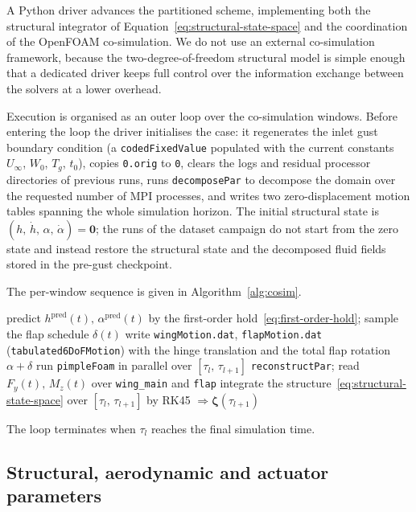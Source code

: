 A Python driver advances the partitioned scheme, implementing both the structural integrator of Equation~\eqref{eq:structural-state-space} and the coordination of the OpenFOAM co-simulation. We do not use an external co-simulation framework, because the two-degree-of-freedom structural model is simple enough that a dedicated driver keeps full control over the information exchange between the solvers at a lower overhead.

Execution is organised as an outer loop over the co-simulation windows. Before entering the loop the driver initialises the case: it regenerates the inlet gust boundary condition (a \texttt{codedFixedValue} populated with the current constants $U_\infty$, $W_0$, $T_g$, $t_0$), copies \texttt{0.orig} to \texttt{0}, clears the logs and residual processor directories of previous runs, runs \texttt{decomposePar} to decompose the domain over the requested number of MPI processes, and writes two zero-displacement motion tables spanning the whole simulation horizon. The initial structural state is $(h,\,\dot h,\,\alpha,\,\dot\alpha) = \mathbf 0$; the runs of the dataset campaign do not start from the zero state and instead restore the structural state and the decomposed fluid fields stored in the pre-gust checkpoint.

The per-window sequence is given in Algorithm~\ref{alg:cosim}.

\begin{algorithm}[H]
\caption{Per-window sequence of the partitioned co-simulation driver}
\label{alg:cosim}
\begin{algorithmic}[1]
    \STATE predict $h^{\mathrm{pred}}(t),\,\alpha^{\mathrm{pred}}(t)$ by the first-order hold~\eqref{eq:first-order-hold}; sample the flap schedule $\delta(t)$
    \STATE write \texttt{wingMotion.dat}, \texttt{flapMotion.dat} (\texttt{tabulated6DoFMotion}) with the hinge translation and the total flap rotation $\alpha+\delta$
    \STATE run \texttt{pimpleFoam} in parallel over $[\tau_l,\,\tau_{l+1}]$
    \STATE \texttt{reconstructPar}; read $F_y(t),\,M_z(t)$ over \texttt{wing\_main} and \texttt{flap}
    \STATE integrate the structure~\eqref{eq:structural-state-space} over $[\tau_l,\,\tau_{l+1}]$ by RK45 $\Rightarrow \boldsymbol{\zeta}(\tau_{l+1})$
\ENDFOR
\end{algorithmic}
\end{algorithm}
The loop terminates when $\tau_l$ reaches the final simulation time.

\subsection{Structural, aerodynamic and actuator parameters}
\label{subsec:results_setup}

